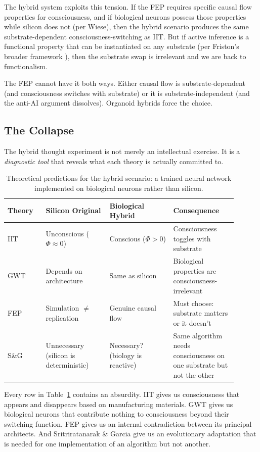 The hybrid system exploits this tension. If the FEP requires specific causal flow
properties for consciousness, and if biological neurons possess those properties
while silicon does not (per Wiese), then the hybrid scenario produces the same
substrate-dependent consciousness-switching as IIT. But if active inference is a
functional property that can be instantiated on any substrate (per Friston's
broader framework \cite{friston2010free}), then the substrate swap is irrelevant
and we are back to functionalism.

The FEP cannot have it both ways. Either causal flow is substrate-dependent (and
consciousness switches with substrate) or it is substrate-independent (and the
anti-AI argument dissolves). Organoid hybrids force the choice.

\subsection{The Collapse}

The hybrid thought experiment is not merely an intellectual exercise. It is a
\emph{diagnostic tool} that reveals what each theory is actually committed to.

\begin{table}[htbp]
\centering
\caption{Theoretical predictions for the hybrid scenario: a trained neural network
implemented on biological neurons rather than silicon.}
\label{tab:hybrid}
\begin{tabular}{p{0.15\linewidth}p{0.25\linewidth}p{0.25\linewidth}p{0.25\linewidth}}
\toprule
\textbf{Theory} & \textbf{Silicon Original} & \textbf{Biological Hybrid} & \textbf{Consequence} \\
\midrule
IIT & Unconscious ($\Phi \approx 0$) & Conscious ($\Phi > 0$) & Consciousness toggles with substrate \\
\midrule
GWT & Depends on architecture & Same as silicon & Biological properties are consciousness-irrelevant \\
\midrule
FEP & Simulation $\neq$ replication & Genuine causal flow & Must choose: substrate matters or it doesn't \\
\midrule
S\&G & Unnecessary (silicon is deterministic) & Necessary? (biology is reactive) & Same algorithm needs consciousness on one substrate but not the other \\
\bottomrule
\end{tabular}
\end{table}

Every row in Table~\ref{tab:hybrid} contains an absurdity. IIT gives us consciousness
that appears and disappears based on manufacturing materials. GWT gives us biological
neurons that contribute nothing to consciousness beyond their switching function. FEP
gives us an internal contradiction between its principal architects. And
Sritriratanarak \& Garcia \cite{sritriratanarak2025consciousness} give us an
evolutionary adaptation that is needed for one implementation of an algorithm but not
another.

